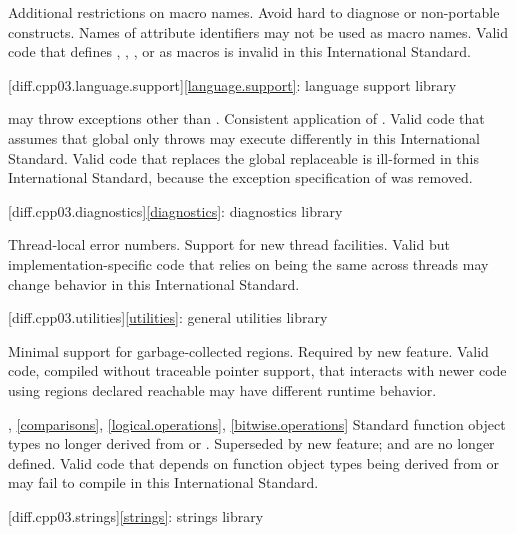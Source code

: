 \change Additional restrictions on macro names.
\rationale Avoid hard to diagnose or non-portable constructs.
\effect
Names of attribute identifiers may not be used as macro names. Valid \CppIII{}
code that defines , ,
, or  as macros is invalid in this
International Standard.

[diff.cpp03.language.support]{\ref{language.support}:
language support library}

\change {} may throw exceptions other than
.
\rationale Consistent application of .
\effect
Valid \CppIII{} code that assumes that global  only
throws  may execute differently in this International
Standard.
Valid \CppIII{} code that replaces the global replaceable 
is ill-formed in this International Standard,
because the exception specification of 
was removed.

[diff.cpp03.diagnostics]{\ref{diagnostics}: diagnostics library}

\change Thread-local error numbers.
\rationale Support for new thread facilities.
\effect Valid but implementation-specific \CppIII{} code that relies on
 being the same across threads may change behavior in this
International Standard.

[diff.cpp03.utilities]{\ref{utilities}: general utilities library}

\change Minimal support for garbage-collected regions.
\rationale Required by new feature.
\effect
Valid \CppIII{} code, compiled without traceable pointer support,
that interacts with newer \Cpp{} code using regions declared reachable may
have different runtime behavior.

, \ref{comparisons},
\ref{logical.operations}, \ref{bitwise.operations}
\change Standard function object types no longer derived from
 or .
\rationale Superseded by new feature;  and
 are no longer defined.
\effect
Valid \CppIII{} code that depends on function object types being derived from
 or  may fail to compile
in this International Standard.

[diff.cpp03.strings]{\ref{strings}: strings library}

